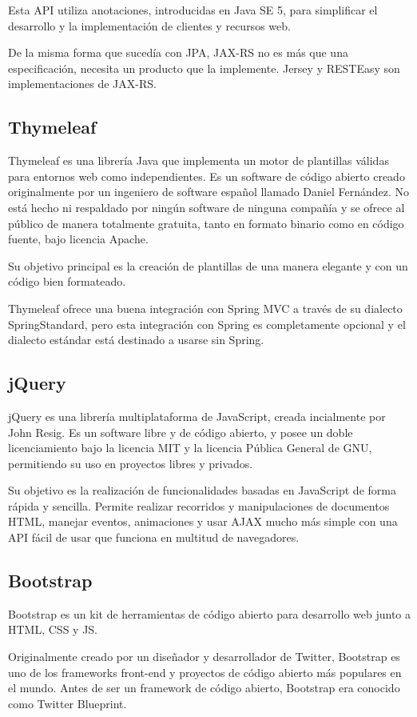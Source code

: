 Esta API utiliza anotaciones, introducidas en Java SE 5, para simplificar el desarrollo y la implementación de clientes y recursos web. 

De la misma forma que sucedía con JPA, JAX-RS no es más que una especificación, necesita un producto que la implemente. Jersey y RESTEasy son implementaciones de JAX-RS.

\subsection{Thymeleaf}
Thymeleaf es una librería Java que implementa un motor de plantillas válidas para entornos web como independientes. Es un software de código abierto creado originalmente por un ingeniero de software español llamado Daniel Fernández. No está hecho ni respaldado por ningún software de ninguna compañía y se ofrece al público de manera totalmente gratuita, tanto en formato binario como en código fuente, bajo licencia Apache.

Su objetivo principal es la creación de plantillas de una manera elegante y con un código bien formateado.

Thymeleaf ofrece una buena integración con Spring MVC a través de su dialecto SpringStandard, pero esta integración con Spring es completamente opcional y el dialecto estándar está destinado a usarse sin Spring.

\subsection{jQuery}
jQuery es una librería multiplataforma de JavaScript, creada incialmente por John Resig. Es un software libre y de código abierto, y posee un doble licenciamiento bajo la licencia MIT y la licencia Pública General de GNU, permitiendo su uso en proyectos libres y privados.

Su objetivo es la realización de funcionalidades basadas en JavaScript de forma rápida y sencilla. Permite realizar recorridos y manipulaciones de documentos HTML, manejar eventos, animaciones y usar AJAX  mucho más simple con una API fácil de usar que funciona en multitud de navegadores.

\subsection{Bootstrap}
Bootstrap es un kit de herramientas de código abierto para desarrollo web junto a HTML, CSS y JS.  

Originalmente creado por un diseñador y desarrollador de Twitter, Bootstrap es uno de los frameworks front-end y proyectos de código abierto más populares en el mundo. Antes de ser un framework de código abierto, Bootstrap era conocido como Twitter Blueprint.

